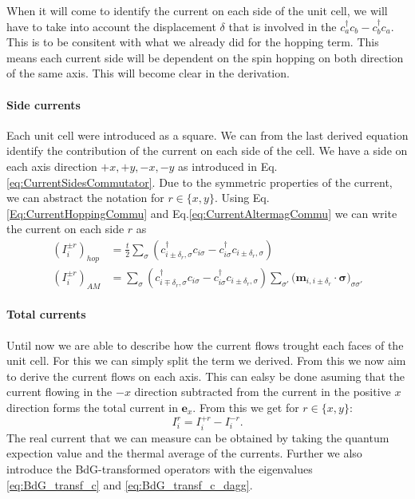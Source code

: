 \documentclass[../main.tex]{subfile}
\begin{document}
When it will come to identify the current on each side of the unit cell, we will have to take into account the displacement $\delta$ that is involved in the $c^{\dagger}_a c_b - c^{\dagger}_b c_a$.
This is to be consitent with what we already did for the hopping term. This means each current side will be dependent on the spin hopping on both direction of the same axis.
This will become clear in the derivation.\\

\paragraph{Side currents}
Each unit cell were introduced as a square. We can from the last derived equation identify the contribution of the current on each side of the cell. We have a side on 
each axis direction $+x, +y, -x, -y$ as introduced in Eq.\ref{eq:CurrentSidesCommutator}. Due to the symmetric properties of the current, we can abstract the notation
for $r\in\{x,y\}$. Using Eq.\ref{Eq:CurrentHoppingCommu} and Eq.\ref{eq:CurrentAltermagCommu} we can write the current on each side $r$ as
\begin{align}
    \left(I_{i}^{\pm r}\right)_{hop} &= \frac{t}{2}\sum_{\sigma}(c_{i\pm\delta_r,\sigma}^{\dagger}c_{i\sigma} -c_{i\sigma}^{\dagger}c_{i\pm\delta_r,\sigma})  \\
    \left(I_{i}^{\pm r}\right)_{AM} &= \sum_{\sigma}\left(c_{i\mp\delta_r,\sigma}^{\dagger}c_{i\sigma} - c_{i\sigma}^{\dagger}c_{i\pm\delta_r,\sigma} \right) 
    \sum_{\sigma'}\bigl(\bm{m}_{i,i\pm\delta_r}\cdot\bm{\sigma}\bigr)_{\sigma\sigma'}
\end{align}


\paragraph{Total currents}
Until now we are able to describe how the current flows trought each faces of the unit cell. For this we can simply split the term we derived.
From this we now aim to derive the current flows on each axis.
This can ealsy be done asuming that the current flowing in the $-x$ direction subtracted from the current in the positive $x$ direction forms the total current in $\bm{e}_x$.
From this we get for $r\in\{x,y\}$:
\[
    I_{i}^{r} = I_{i}^{+r} - I_{i}^{-r}.
\]
The real current that we can measure can be obtained by taking the quantum expection value and the thermal average of the currents. Further we also introduce the 
BdG-transformed operators with the eigenvalues \ref{eq:BdG_transf_c} and \ref{eq:BdG_transf_c_dagg}. \\
\end{document}
